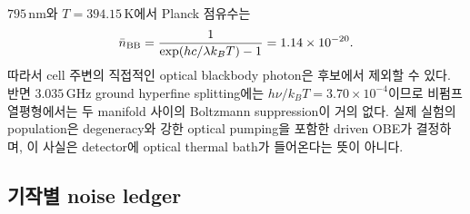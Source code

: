 \documentclass[11pt,a4paper]{article}
\newcommand{\GHz}{\,\mathrm{GHz}}
\begin{document}
$795\,\mathrm{nm}$와 $T=394.15\,\mathrm K$에서 Planck 점유수는
\begin{equation}
\bar n_{\rm BB}=\frac{1}{\exp(hc/\lambda k_BT)-1}
=1.14\times10^{-20}.
\end{equation}
따라서 cell 주변의 직접적인 optical blackbody photon은 후보에서 제외할 수 있다.
반면 $3.035\GHz$ ground hyperfine splitting에는
$h\nu/k_BT=3.70\times10^{-4}$이므로 비펌프 열평형에서는 두 manifold 사이의
Boltzmann suppression이 거의 없다. 실제 실험의 population은 degeneracy와 강한
optical pumping을 포함한 driven OBE가 결정하며, 이 사실은 detector에 optical
thermal bath가 들어온다는 뜻이 아니다.

\subsection{기작별 noise ledger}
\end{document}
